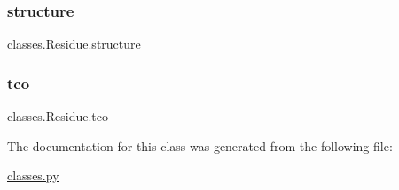 \subsubsection{\texorpdfstring{structure}{structure}}
{\footnotesize\ttfamily classes.\+Residue.\+structure}

\mbox{\label{classclasses_1_1Residue_a21b24a0d44cd90ba82d8ea839677f13a}} 
\subsubsection{\texorpdfstring{tco}{tco}}
{\footnotesize\ttfamily classes.\+Residue.\+tco}



The documentation for this class was generated from the following file\+:\begin{DoxyCompactItemize}
\item 
\hyperlink{classes_8py}{classes.\+py}\end{DoxyCompactItemize}
